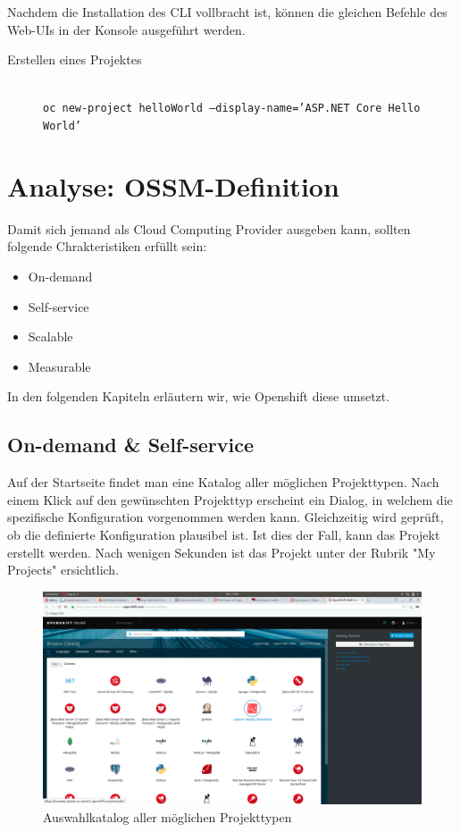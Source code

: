 \documentclass[12pt,a4paper]{article}
\begin{document}
Nachdem die Installation des CLI vollbracht ist, können die gleichen Befehle des Web-UIs in der Konsole ausgeführt werden. 
\begin{description}
	\item[Erstellen eines Projektes] \hfill\\
	\texttt{oc new-project helloWorld --display-name='ASP.NET Core Hello World'}
	\item[]
\end{description}
\section{Analyse: OSSM-Definition}

Damit sich jemand als Cloud Computing Provider ausgeben kann, sollten folgende Chrakteristiken erfüllt sein:

\begin{itemize}
	\item On-demand
	\item Self-service
	\item Scalable
	\item Measurable
\end{itemize}

In den folgenden Kapiteln erläutern wir, wie Openshift diese umsetzt.

\subsection{On-demand \& Self-service}

Auf der Startseite findet man eine Katalog aller möglichen Projekttypen. Nach einem Klick auf den gewünschten Projekttyp erscheint ein Dialog, in welchem die spezifische Konfiguration vorgenommen werden kann. Gleichzeitig wird geprüft, ob die definierte Konfiguration plausibel ist. Ist dies der Fall, kann das Projekt erstellt werden.
Nach wenigen Sekunden ist das Projekt unter der Rubrik "My Projects" ersichtlich.

\begin{figure}[h]
	\centering
	\includegraphics[width=0.7\linewidth]{img/os-overview-catalog}
	\caption{Auswahlkatalog aller möglichen Projekttypen}
	\label{fig:os-catalog}
\end{figure}
\end{document}
